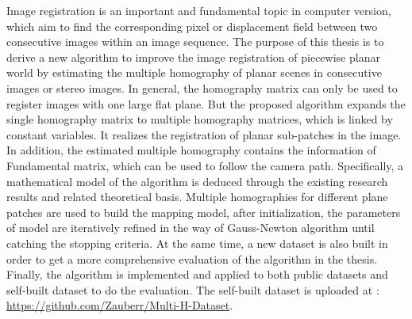 
Image registration is an important and fundamental topic in computer version, which aim to find the corresponding pixel or displacement field between two consecutive images within an image sequence. The purpose of this thesis is to derive a new algorithm to improve the image registration of piecewise planar world by estimating the multiple homography of planar scenes in consecutive images or stereo images. In general, the homography matrix can only be used to register images with one large flat plane. But the proposed algorithm expands the single homography matrix to multiple homography matrices, which is linked by constant variables. It realizes the registration of planar sub-patches in the image. In addition, the estimated multiple homography contains the information of Fundamental matrix, which can be used to follow the camera path. Specifically, a mathematical model of the algorithm is deduced through the existing research results and related theoretical basis. Multiple homographies for different plane patches are used to build the mapping model, after initialization, the parameters of model are iteratively refined in the way of Gauss-Newton algorithm until catching the stopping criteria. At the same time, a new dataset is also built in order to get a more comprehensive evaluation of the algorithm in the thesis. Finally, the algorithm is implemented and applied to both public datasets and self-built dataset to do the evaluation. The self-built dataset is uploaded at : \url{https://github.com/Zauberr/Multi-H-Dataset}.